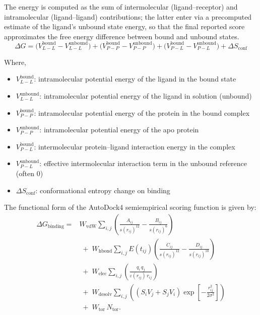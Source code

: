 \documentclass[12pt, a4paper]{article}
\begin{document}
The energy is computed as the sum of intermolecular (ligand--receptor) and intramolecular (ligand--ligand) contributions; the latter enter via a precomputed estimate of the ligand's unbound state energy, so that the final reported score approximates the free energy difference between bound and unbound states.
\[
\Delta G =
\bigl( V_{L-L}^{\text{bound}} - V_{L-L}^{\text{unbound}} \bigr)
+
\bigl( V_{P-P}^{\text{bound}} - V_{P-P}^{\text{unbound}} \bigr)
+
\bigl( V_{P-L}^{\text{bound}} - V_{P-L}^{\text{unbound}} \bigr)
+
\Delta S_{\text{conf}}
\]


Where,
\begin{itemize}
 \item $V_{L-L}^{\text{bound}}$: intramolecular potential energy of the ligand in the bound state
 \item $V_{L-L}^{\text{unbound}}$: intramolecular potential energy of the ligand in solution (unbound)
\item $V_{P-P}^{\text{bound}}$: intramolecular potential energy of the protein in the bound complex
\item $V_{P-P}^{\text{unbound}}$: intramolecular potential energy of the apo protein
\item $V_{P-L}^{\text{bound}}$: intermolecular protein–ligand interaction energy in the complex
\item $V_{P-L}^{\text{unbound}}$: effective intermolecular interaction term in the unbound reference (often 0)
\item $\Delta S_{\text{conf}}$: conformational entropy change on binding
\end{itemize}

The functional form of the AutoDock4 semiempirical scoring function is given by: 
\begin{equation}
\label{eq:ad4_scoring}
\begin{aligned}
  \Delta G_{\text{binding}} = {} &
  W_{\text{vdW}}
  \sum_{i,j}
  \left(
    \frac{A_{ij}}{s(r_{ij})^{12}}
    - \frac{B_{ij}}{s(r_{ij})^{6}}
  \right)
  \\
  & \;+\;
  W_{\text{hbond}}
  \sum_{i,j}
  E(t_{ij})
  \left(
    \frac{C_{ij}}{s(r_{ij})^{12}}
    - \frac{D_{ij}}{s(r_{ij})^{10}}
  \right)
  \\
  & \;+\;
  W_{\text{elec}}
  \sum_{i,j}
  \left(
    \frac{q_i \, q_j}{\varepsilon(r_{ij}) \, r_{ij}}
  \right)
  \\
  & \;+\;
  W_{\text{desolv}}
  \sum_{i,j}
  \left(
    \left( S_i V_j + S_j V_i \right)
    \exp\left[
      - \frac{r_{ij}^2}{2 \sigma^2}
    \right]
  \right)
  \\
  & \;+\;
  W_{\text{tor}} \, N_{\text{tor}}.
\end{aligned}
\end{equation}
\end{document}
